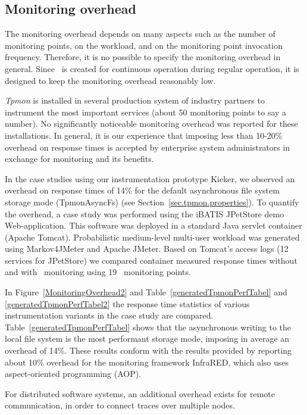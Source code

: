 \documentclass[a4paper,12pt]{scrartcl}
\begin{document}
\subsection{Monitoring overhead}

The monitoring overhead depends on many aspects such as the number of monitoring points, on the workload, and on the monitoring point invocation frequency. Therefore, it is no possible to specify the monitoring overhead in general. Since \tpmon\ is created for continuous operation during regular operation, it is designed to keep the monitoring
overhead reasonably low.

\textit{Tpmon} is installed in several production system of industry partners to instrument the most important services (about 50 monitoring points to say a number). No significantly noticeable monitoring overhead was reported for these installations. In general, it is our experience that imposing less than 10-20\% overhead on response times is accepted by enterprise system administrators in exchange for monitoring and its benefits.

In the case studies using our instrumentation prototype Kieker, we observed an overhead on response times of 14\% for the default asynchronous file system storage mode (TpmonAsyncFs) (see Section~\ref{sec.tpmon.properties}). To quantify the overhead, a case study was performed using the iBATIS JPetStore demo Web-application. This software was deployed in a standard Java servlet container (Apache Tomcat). Probabilistic medium-level multi-user workload was generated using Markov4JMeter and Apache JMeter. Based on Tomcat's access logs (12 services for JPetStore) we compared container measured response times without and with \tpmon\ monitoring using 19 \tpmon\ monitoring points.

In Figure~\ref{MonitoringOverhead2} and Table~\ref{generatedTpmonPerfTabel} and  \ref{generatedTpmonPerfTabel2} the response time statistics of various instrumentation variants in the case study are compared. Table~\ref{generatedTpmonPerfTabel} shows that the asynchronous writing to the local file system is the most performant storage mode, imposing in average an overhead of 14\%. These results conform with the results provided by \citet{GovindrajNarayananThomasNairP06OnUsingAOPforApplicationPerformanceManagement} reporting about 10\% overhead for the
monitoring framework InfraRED, which also uses aspect-oriented programming (AOP).

For distributed software systems, an additional overhead exists for remote communication, in order to connect traces over multiple nodes.
\end{document}
